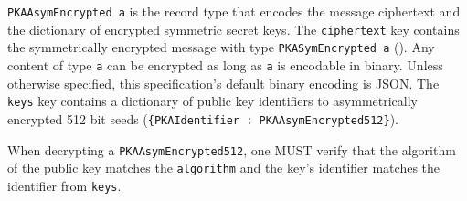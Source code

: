 \documentclass{article}
\begin{document}
\texttt{PKAAsymEncrypted a} is the record type that encodes the message ciphertext and the dictionary of encrypted symmetric secret keys. 
The \texttt{ciphertext} key contains the symmetrically encrypted message with type \texttt{PKASymEncrypted a} (). 
Any content of type \texttt{a} can be encrypted as long as \texttt{a} is encodable in binary. 
Unless otherwise specified, this specification's default binary encoding is JSON. 
The \texttt{keys} key contains a dictionary of public key identifiers to asymmetrically encrypted 512 bit seeds (\texttt{\{PKAIdentifier : PKAAsymEncrypted512\}}). 

%
%
%

When decrypting a \texttt{PKAAsymEncrypted512}, one MUST verify that the algorithm of the public key matches the \texttt{algorithm} %
and the key's identifier matches the identifier from \texttt{keys}. 

%
%
%
%
\end{document}
